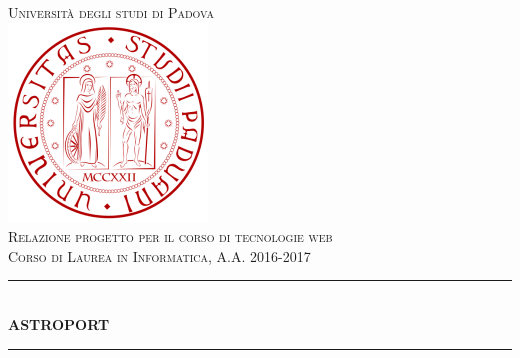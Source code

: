 	\begin{titlepage}
	
	\newcommand{\HRule}{\rule{\linewidth}{0.5mm}} %
	
	\center %
	
	
	\textsc{\LARGE Università degli studi di Padova}\\[1.5cm] %
	\includegraphics[scale=0.3]{images/unipd_logo.png}\\[1cm] %
	\textsc{\Large Relazione progetto per il corso di tecnologie web}\\[0.5cm] %
	\textsc{\large Corso di Laurea in Informatica, A.A. 2016-2017}\\[0.5cm] %
	
	\HRule \\[0.4cm]
	{ \huge \bfseries ASTROPORT}\\[0.4cm] %
	\HRule \\[1.5cm]
	
	

\end{titlepage}
